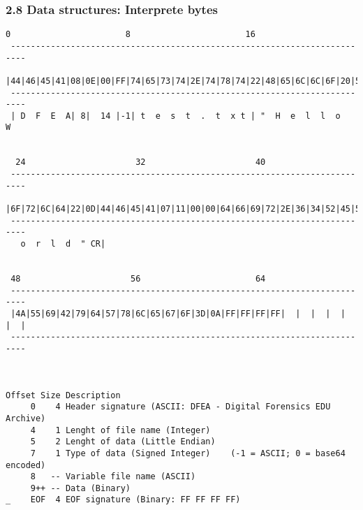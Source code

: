 \begin{frame}[fragile]
  \frametitle{2.8 Data structures: Interprete bytes}
\begin{lstlisting}[basicstyle=\tiny]
  0                       8                       16                      
 ------------------------------------------------------------------------- 
 |44|46|45|41|08|0E|00|FF|74|65|73|74|2E|74|78|74|22|48|65|6C|6C|6F|20|57|
 -------------------------------------------------------------------------
 | D  F  E  A| 8|  14 |-1| t  e  s  t  .  t  x t | "  H  e  l  l  o     W


  24                      32                      40
 -------------------------------------------------------------------------
 |6F|72|6C|64|22|0D|44|46|45|41|07|11|00|00|64|66|69|72|2E|36|34|52|45|5A|
 -------------------------------------------------------------------------
   o  r  l  d  " CR|


 48                      56                       64
 -------------------------------------------------------------------------
 |4A|55|69|42|79|64|57|78|6C|65|67|6F|3D|0A|FF|FF|FF|FF|  |  |  |  |  |  |
 -------------------------------------------------------------------------



Offset Size Description
     0    4 Header signature (ASCII: DFEA - Digital Forensics EDU Archive)
     4    1 Lenght of file name (Integer)
     5    2 Lenght of data (Little Endian)
     7    1 Type of data (Signed Integer)    (-1 = ASCII; 0 = base64 encoded)
     8   -- Variable file name (ASCII)
     9++ -- Data (Binary)
_    EOF  4 EOF signature (Binary: FF FF FF FF)
\end{lstlisting}
\end{frame}


